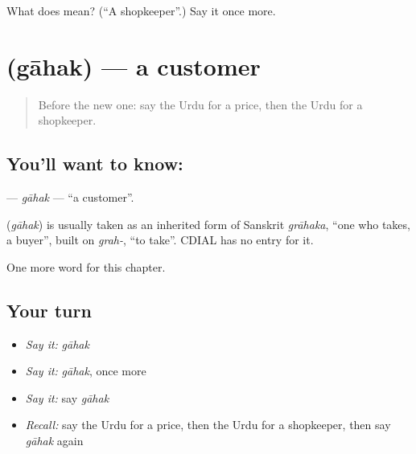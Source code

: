 \begin{tcolorbox}[breakable,colback=teal!4,colframe=teal!35!black,title={Before you move on}]
What does  mean? (\textquotedblleft{}A shopkeeper\textquotedblright{}.) Say it once more.
\end{tcolorbox}
\section[\texorpdfstring{\ur{گاہک} (gāhak)}{گاہک (gāhak)}]{ (gāhak) — a customer}

\label{lesson:UR-C236-gahak}



\begin{quote}
Before the new one: say the Urdu for a price, then the Urdu for a shopkeeper.
\end{quote}

\subsection*{You'll want to know: }
\textbf{} — \emph{gāhak} — \textquotedblleft{}a customer\textquotedblright{}.

\begin{cousinweb}
\textbf{} (\emph{gāhak}) is usually taken as an inherited form of Sanskrit \emph{grāhaka}, \textquotedblleft{}one who takes, a buyer\textquotedblright{}, built on \emph{grah-}, \textquotedblleft{}to take\textquotedblright{}. CDIAL has no entry for it.
\end{cousinweb}

\begin{grammarlens}[title={What you've built}]
One more word for this chapter.
\end{grammarlens}

\subsection*{Your turn}
\begin{itemize}
\raggedright
  \item \emph{Say it:} \emph{gāhak}
  \item \emph{Say it:} \emph{gāhak}, once more
  \item \emph{Say it:} say \emph{gāhak}
  \item \emph{Recall:} say the Urdu for a price, then the Urdu for a shopkeeper, then say \emph{gāhak} again
\end{itemize}

